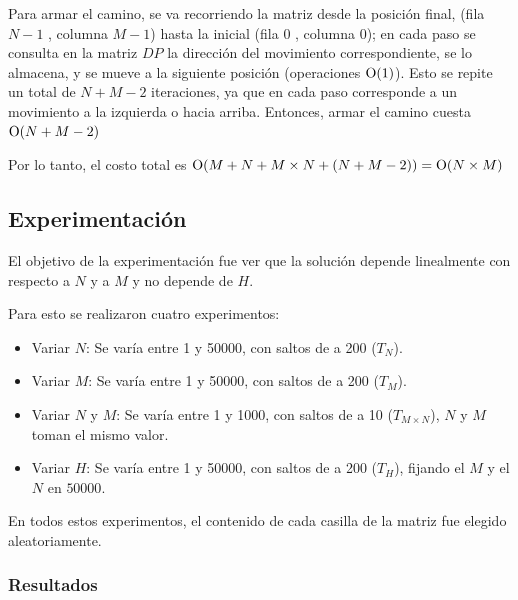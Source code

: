     Para armar el camino, se va recorriendo la matriz desde la posición final, (fila $N - 1$ , columna $M - 1$) hasta la inicial (fila $0$ , columna $0$); en cada paso se consulta en la matriz $DP$ la dirección del movimiento correspondiente, se lo almacena, y se mueve a la siguiente posición (operaciones $\operatorname{O}(1)$). Esto se repite un total de $N + M - 2$ iteraciones, ya que en cada paso corresponde a un movimiento a la izquierda o hacia arriba. Entonces, armar el camino cuesta $\operatorname{O}(N + M - 2)$

    Por lo tanto, el costo total es $\operatorname{O}( M + N + M \times N + (N + M - 2) ) = \operatorname{O}(N \times M)$

    \subsection{Experimentación}
    El objetivo de la experimentación fue ver que la solución depende linealmente con respecto a $N$ y a $M$ y no depende de $H$.

    Para esto se realizaron cuatro experimentos:
    \begin{itemize}
        \item Variar $N$: Se varía entre 1 y 50000, con saltos de a 200 ($T_N$).
        \item Variar $M$: Se varía entre 1 y 50000, con saltos de a 200 ($T_M$).
        \item Variar $N$ y $M$: Se varía entre 1 y 1000, con saltos de a 10 ($T_{M \times N}$), $N$ y $M$ toman el mismo valor.
        \item Variar $H$: Se varía entre 1 y 50000, con saltos de a 200 ($T_H$), fijando el $M$ y el $N$ en $50000$.
    \end{itemize}
    En todos estos experimentos, el contenido de cada casilla de la matriz
    fue elegido aleatoriamente.

    \subsubsection{Resultados}

